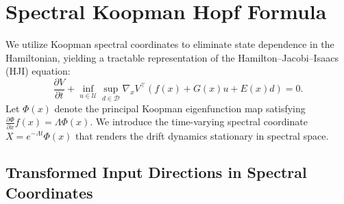 \documentclass[letterpaper, 10 pt, conference]{ieeeconf}
\theoremstyle{plain}
\theoremstyle{definition}
\begin{document}
\section{Spectral Koopman Hopf Formula}

We utilize Koopman spectral coordinates to eliminate state dependence in the Hamiltonian, yielding a tractable representation of the Hamilton–Jacobi–Isaacs (HJI) equation:
\[
\frac{\partial V}{\partial t}
+
\inf_{u\in\mathcal U}
\sup_{d\in\mathcal D}
\nabla_x V^\top\!\left(f(x)+G(x)u+E(x)d\right)
=
0.
\]
Let $\Phi(x)$ denote the principal Koopman eigenfunction map satisfying
$\frac{\partial \Phi}{\partial x} f(x) = \Lambda \Phi(x)$.
We introduce the time-varying spectral coordinate $X = e^{-\Lambda t}\Phi(x)$ that renders the drift dynamics stationary in spectral space.



\subsection{Transformed Input Directions in Spectral Coordinates}
\end{document}
